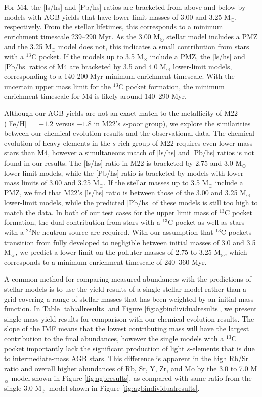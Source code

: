 For M4, the [ls/hs] and [Pb/hs] ratios are bracketed from above and below by models with AGB yields that have lower limit masses of 3.00 and 3.25 M$_\odot$, respectively. From the stellar lifetimes, this corresponds to a minimum enrichment timescale 239--290 Myr. As the 3.00 M$_\odot$ stellar model includes a PMZ and the 3.25 M$_\odot$ model does not, this indicates a small contribution from stars with a $^{13}$C pocket. If the models up to 3.5 M$_\odot$ include a PMZ, the [ls/hs] and [Pb/hs] ratios of M4 are bracketed by 3.5 and 4.0 M$_\odot$ lower-limit models, corresponding to a 140-200 Myr minimum enrichment timescale. With the uncertain upper mass limit for the $^{13}$C pocket formation, the minimum enrichment timescale for M4 is likely around 140--290 Myr.

Although our AGB yields are not an exact match to the metallicity of M22 ([Fe/H] $=-1.2$ versus $-1.8$ in M22's $s$-poor group), we explore the similarities between our chemical evolution results and the observational data. The chemical evolution of heavy elements in the $s$-rich group of M22 requires even lower mass stars than M4, however a simultaneous match of [ls/hs] and [Pb/hs] ratios is not found in our results. The [ls/hs] ratio in M22 is bracketed by 2.75 and 3.0 M$_\odot$ lower-limit models, while the [Pb/hs] ratio is bracketed by models with lower mass limits of 3.00 and 3.25 M$_\odot$. If the stellar masses up to 3.5 M$_\odot$ include a PMZ, we find that M22's [ls/hs] ratio is between those of the 3.00 and 3.25 M$_\odot$ lower-limit models, while the predicted [Pb/hs] of these models is still too high to match the data. In both of our test cases for the upper limit mass of $^{13}$C pocket formation, the dual contribution from stars with a $^{13}$C pocket as well as stars with a $^{22}$Ne neutron source are required. With our assumption that $^{13}$C pockets transition from fully developed to negligible between initial masses of 3.0 and 3.5 M$_\sun$, we predict a lower limit on the polluter masses of 2.75 to 3.25 M$_\odot$, which corresponds to a minimum enrichment timescale of 240--360 Myr.

A common method for comparing measured abundances with the predictions of stellar models is to use the yield results of a single stellar model rather than a grid covering a range of stellar masses that has been weighted by an initial mass function. In Table \ref{tab:allresults} and Figure \ref{fig:agbindividualresults}, we present single-mass yield results for comparison with our chemical evolution results. The slope of the IMF means that the lowest contributing mass will have the largest contribution to the final abundances, however the single models with a $^{13}$C pocket importantly lack the significant production of light $s$-elements that is due to intermediate-mass AGB stars. This difference is apparent in the high Rb/Sr ratio and overall higher abundances of Rb, Sr, Y, Zr, and Mo by the 3.0 to 7.0 M$_\sun$ model shown in Figure \ref{fig:agbresults}, as compared with same ratio from the single 3.0 M$_\sun$ model shown in Figure \ref{fig:agbindividualresults}. 

